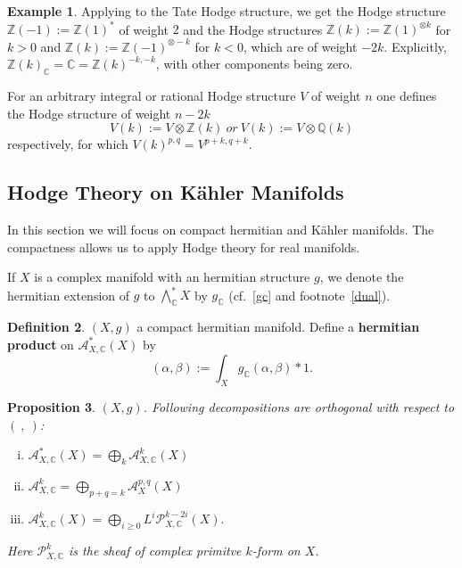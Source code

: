 \documentclass{article}
\theoremstyle{definition}
\newtheorem{definition}{Definition}[subsection]
\newtheorem{example}[definition]{Example}
\theoremstyle{plain}
\newtheorem{proposition}[definition]{Proposition}
\begin{document}
\begin{example}
    Applying to the Tate Hodge structure, we get the Hodge structure $ \mathbb{Z}(-1):=\mathbb{Z}(1)^* $ of weight $ 2 $ and the Hodge structures $ \mathbb{Z}(k):=\mathbb{Z}(1)^{\otimes k} $ for $ k>0 $ and $ \mathbb{Z}(k):=\mathbb{Z}(-1)^{\otimes -k} $ for $ k<0 $, which are of weight $ -2k $. Explicitly, $ \mathbb{Z}(k)_{\mathbb{C}}=\mathbb{C}=\mathbb{Z}(k)^{-k,-k} $, with other components being zero.
    
    For an arbitrary integral or rational Hodge structure $ V $ of weight $ n $ one defines the Hodge structure of weight $ n-2k $\[
        V(k):=V\otimes \mathbb{Z}(k)\ or\ V(k):=V\otimes \mathbb{Q}(k)
    \]respectively, for which $ V(k)^{p,q}=V^{p+k,q+k} $.
\end{example}

\subsection{Hodge Theory on K\"{a}hler Manifolds}

In this section we will focus on compact hermitian and K\"{a}hler manifolds. The compactness allows us to apply Hodge theory for real manifolds.

If $ X $ is a complex manifold with an hermitian structure $ g $, we denote the hermitian extension of $ g $ to $ \bigwedge^*_{\mathbb{C}}X $ by $ g_{\mathbb{C}} $ (cf.\ \ref{gc} and footnote~\ref{dual}).

\begin{definition}
    $ (X,g) $ a compact hermitian manifold. Define a \textbf{hermitian product} on $ \mathcal{A}^*_{X,\mathbb{C}}(X) $ by\[
        (\alpha,\beta):=\int_{X} g_{\mathbb{C}}(\alpha,\beta)*\mathrm{1}.
    \]
\end{definition}

\begin{proposition}
    $ (X,g) $. Following decompositions are orthogonal with respect to $ (\ ,\ ) $:\begin{enumerate}[(i)]
        \item $ \mathcal{A}^*_{X,\mathbb{C}}(X)=\bigoplus_k\mathcal{A}^k_{X,\mathbb{C}}(X) $
        \item $ \mathcal{A}^k_{X,\mathbb{C}}=\bigoplus_{p+q=k}\mathcal{A}^{p,q}_{X}(X) $
        \item $ \mathcal{A}^k_{X,\mathbb{C}}(X)=\bigoplus_{i\geqslant 0}L^i \mathcal{P}^{k-2i}_{X,\mathbb{C}}(X). $
    \end{enumerate}Here $ \mathcal{P}^k_{X,\mathbb{C}} $ is the sheaf of complex primitve $ k $-form on $ X $.
\end{proposition}
\end{document}
